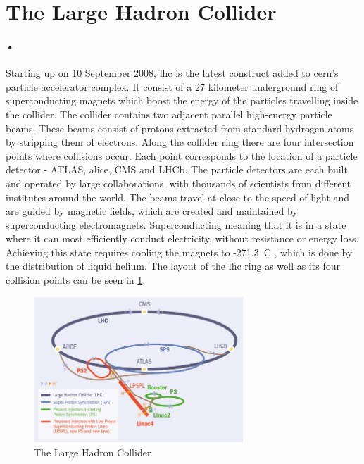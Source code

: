 \documentclass[a4paper, 12pt]{report}
\begin{document}
\section{The Large Hadron Collider}
\label{sec:lhc}
\paragraph{•}
Starting up on 10 September 2008, \gls{lhc} is the latest construct added to \gls{cern}'s particle accelerator complex\cite{lhc}.
It consist of a 27 kilometer underground ring of superconducting magnets which boost the energy of the particles travelling inside the collider.
The collider contains two adjacent parallel high-energy particle beams.
These beams consist of protons extracted from standard hydrogen atoms by stripping them of electrons.
Along the collider ring there are four intersection points where collisions occur.
Each point corresponds to the location of a particle detector - ATLAS, \gls{alice}, CMS and LHCb.
The particle detectors are each built and operated by large collaborations, with thousands of scientists from different institutes around the world.
The beams travel at close to the speed of light and are guided by magnetic fields, which are created and maintained by superconducting electromagnets.
Superconducting meaning that it is in a state where it can most efficiently conduct electricity, without resistance or energy loss.
Achieving this state requires cooling the magnets to -271.3\degree~C , which is done by the distribution of liquid helium.
The layout of the \gls{lhc} ring as well as its four collision points can be seen in \ref{fig:lhc}.

\begin{figure}[h!]
  \centering
    \includegraphics[width=0.7\textwidth]{images/lhc-ring.jpg}
     \caption{The Large Hadron Collider \cite{lhc-ring-image}}
    \label{fig:lhc}
\end{figure}
\end{document}
